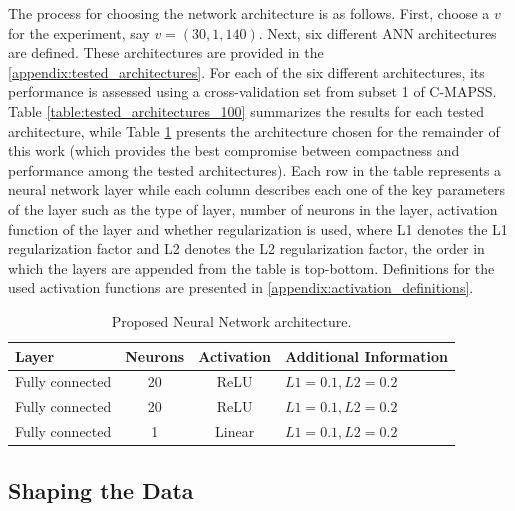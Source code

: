 \documentclass[preprint,12pt]{elsarticle}%
\begin{document}
The process for choosing the network architecture is as follows. First, choose
a $v$ for the experiment, say $v= (30, 1, 140)$. Next, six different ANN
architectures are defined. These architectures are provided in
the \ref{appendix:tested_architectures}. For each of the six different architectures,
its performance is assessed using a cross-validation set from subset 1 of
C-MAPSS. Table \ref{table:tested_architectures_100} summarizes the results for
each tested architecture, while Table \ref{table:proposed_nn} presents the
architecture chosen for the remainder of this work (which provides the best compromise between compactness and performance among the tested architectures). Each row in the table represents a neural network layer while each column describes each one of the key parameters of the layer such as the type of layer, number of neurons in the layer, activation function of the layer and whether regularization is used, where L1 denotes the L1 regularization factor and L2 denotes the L2 regularization factor, the order in which the layers are appended from the table is top-bottom. Definitions for the used activation functions are presented in \ref{appendix:activation_definitions}.

\begin{table}[!htb]
\begin{center}
\begin{tabular}
[c]{llll}\hline
Layer & Neurons & Activation & Additional Information\\\hline
Fully connected & \multicolumn{1}{c}{20} & \multicolumn{1}{c}{ReLU} &
$L1=0.1,L2=0.2$\\
Fully connected & \multicolumn{1}{c}{20} & \multicolumn{1}{c}{ReLU} &
$L1=0.1,L2=0.2$\\
Fully connected & \multicolumn{1}{c}{1} & \multicolumn{1}{c}{Linear} &
$L1=0.1,L2=0.2$\\\hline
\end{tabular}
\caption{Proposed Neural Network architecture.}
\label{table:proposed_nn}
\end{center}
\end{table}

\subsection{Shaping the Data}
\end{document}
